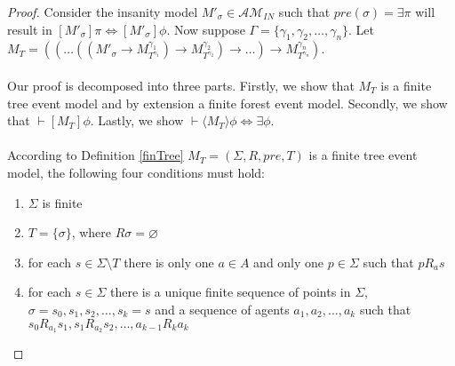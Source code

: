 \documentclass[12pt, a4paper, titlepage]{scrartcl}
\numberwithin{equation}{section}
\newcommand{\sqex}[1]{[{#1}]}
\newcommand{\anex}[1]{\langle {#1} \rangle}
\newcommand{\eventClass}{\mathcal{AM}}
\newcommand{\insaneClass}{\eventClass_{IN}}
\begin{document}
\begin{proof}
Consider the insanity model $M'_\sigma \in \insaneClass$ such that $pre(\sigma) =
\exists \pi$ will result in $\sqex{M'_\sigma} \pi \iff \sqex{M'_\sigma} \phi$.
Now suppose $\Gamma = \{ \gamma_1, \gamma_2, \ldots, \gamma_n \}$.
Let $M_T = ((\ldots((M'_\sigma \to M^{\gamma_1}_{T^{\gamma_1}}) \to
			M^{\gamma_2}_{T^{\gamma_2}}) \to \ldots ) \to M^{\gamma_n}_{T^{\gamma_n}} )$.\\
\\
Our proof is decomposed into three parts.
Firstly, we show that $M_T$ is a finite tree event model and by extension a finite forest event
model.
Secondly, we show that $\vdash \sqex{M_T} \phi$.
Lastly, we show $\vdash \anex{ M_T } \phi \iff \exists \phi$.\\
\\
According to Definition \ref{finTree} $M_T = (\Sigma, R, pre, T)$ is a finite tree event model, the following four conditions must hold:
\begin{enumerate}
	\item $\Sigma$ is finite \label{treeConFinite}
	\item $T = \{\sigma\}$, where $R \sigma = \varnothing$ \label{treeConRoot}
	\item for each $s \in \Sigma \setminus T$ there is only one $a \in A$ and only one $p \in \Sigma$
	such that $p R_a s$ \label{treeConOneAgent}
	\item for each $s \in \Sigma$ there is a unique finite sequence of points in $\Sigma$, $\sigma =
	s_0, s_1, s_2, \ldots, s_k = s$ and a sequence of agents $a_1, a_2, \ldots, a_k$ such that $s_0
	R_{a_1} s_1, s_1 R_{a_2} s_2, \ldots, a_{k-1} R_k
	a_k$ \label{treeConUniquePath}
\end{enumerate}


\end{proof}
\end{document}
